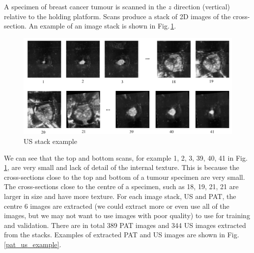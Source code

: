 A specimen of breast cancer tumour is scanned in the $z$ direction (vertical) relative to the holding platform. Scans produce a stack of 2D images of the cross-section. An example of an image stack is shown in Fig.\,\ref{stack}. 

\begin{figure}[h]
	\centering
	\includegraphics[width=\textwidth]{Figs/pat_stack_50.jpg}
    \caption{US stack example}
    \label{stack}
\end{figure}

We can see that the top and bottom scans, for example 1, 2, 3, 39, 40, 41 in Fig.\,\ref{stack}, are very small and lack of detail of the internal texture. This is because the cross-sections close to the top and bottom of a tumour specimen are very small. The cross-sections close to the centre of a specimen, such as 18, 19, 21, 21 are larger in size and have more texture. For each image stack, US and PAT, the centre 6 images are extracted (we could extract more or even use all of the images, but we may not want to use images with poor quality) to use for training and validation. There are in total 389 PAT images and 344 US images extracted from the stacks. Examples of extracted PAT and US images are shown in Fig.\,\ref{pat_us_example}.

